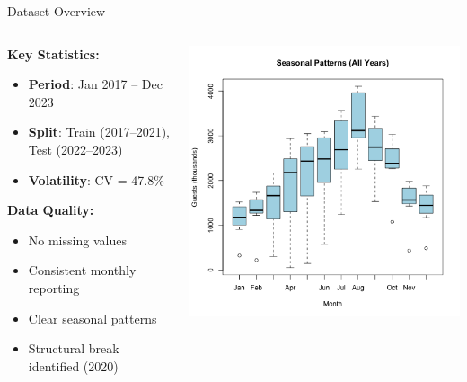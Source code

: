 \documentclass[10pt]{beamer}
\begin{document}
\begin{frame}{Dataset Overview}
\begin{columns}
\begin{column}{0.45\textwidth}
\textbf{Key Statistics:}
\begin{itemize}
\item \textbf{Period}: Jan 2017 -- Dec 2023
\item \textbf{Split}: Train (2017--2021), Test (2022--2023)
\item \textbf{Volatility}: CV = 47.8\%
\end{itemize}

\vspace{0.3cm}
\textbf{Data Quality:}
\begin{itemize}
\item No missing values
\item Consistent monthly reporting
\item Clear seasonal patterns
\item Structural break identified (2020)
\end{itemize}

\end{column}

\begin{column}{0.55\textwidth}
\includegraphics[width=\textwidth,height=0.85\textheight,keepaspectratio]{plots/seasonal-patterns.png}
\end{column}
\end{columns}
\end{frame}
\end{document}
